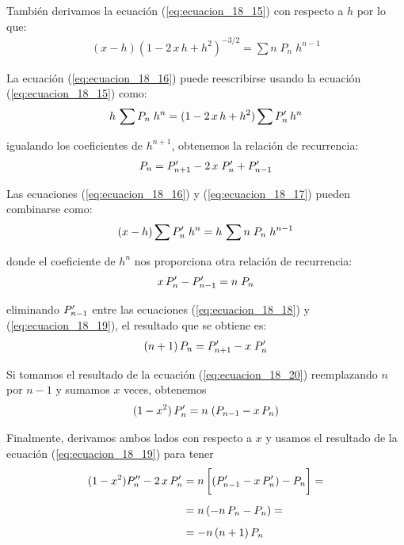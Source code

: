 También derivamos la ecuación (\ref{eq:ecuacion_18_15}) con respecto a $h$ por lo que:
\begin{align}
(x - h) (1 - 2 \, x \, h + h^{2})^{-3/2} = \sum n \; P_{n} \; h^{n-1}
\label{eq:ecuacion_18_17}
\end{align}

La ecuación (\ref{eq:ecuacion_18_16}) puede reescribirse usando la ecuación (\ref{eq:ecuacion_18_15}) como:
\begin{align*}
h \, \sum P_{n} \; h^{n} =  (1 - 2 \, x \, h + h^{2}) \sum {P}^{\prime}_{n} \, h^{n}
\end{align*}

igualando los coeficientes de $h^{n+1}$, obtenemos la relación de recurrencia:
\begin{align}
P_{n} = {P}^{\prime}_{n+1} - 2 \, x \; {P}^{\prime}_{n} + {P}^{\prime}_{n-1}
\label{eq:ecuacion_18_18}
\end{align}

Las ecuaciones (\ref{eq:ecuacion_18_16}) y (\ref{eq:ecuacion_18_17}) pueden combinarse como:
\begin{align*}
(x - h) \sum {P}^{\prime}_{n} \; h^{n} = h \, \sum n \; P_{n} \; h^{n-1}
\end{align*}

donde el coeficiente de $h^{n}$ nos proporciona otra relación de recurrencia:
\begin{align}
x \, {P}^{\prime}_{n} - {P}^{\prime}_{n-1} =  n \; P_{n}
\label{eq:ecuacion_18_19}
\end{align}

eliminando ${P}^{\prime}_{n-1}$ entre las ecuaciones (\ref{eq:ecuacion_18_18}) y (\ref{eq:ecuacion_18_19}), el resultado que se obtiene es:
\begin{align}
(n + 1) \, P_{n} = {P}^{\prime}_{n+1} - x \; {P}^{\prime}_{n}
\label{eq:ecuacion_18_20}
\end{align}

Si tomamos el resultado de la ecuación (\ref{eq:ecuacion_18_20}) reemplazando $n$ por $n-1$ y sumamos $x$ veces, obtenemos
\begin{align}
(1 - x^{2}) \, {P}^{\prime}_{n} = n \; (P_{n-1} - x \, P_{n})
\label{eq:ecuacion_18_21}
\end{align}

Finalmente, derivamos ambos lados con respecto a $x$ y usamos el resultado de la ecuación (\ref{eq:ecuacion_18_19}) para tener
\begin{align*}
(1 - x^{2}) {P}^{\prime \prime}_{n} - 2 \, x \, {P}^{\prime}_{n} &= n \, \bigg[ ({P}^{\prime}_{n-1} - x \, {P}^{\prime}_{n}) - P_{n} \bigg] = \\[0.5em]
&= n \, (-n \, P_{n} - P_{n}) = \\[0.5em]
&= -n \, (n + 1) \, P_{n}
\end{align*}


